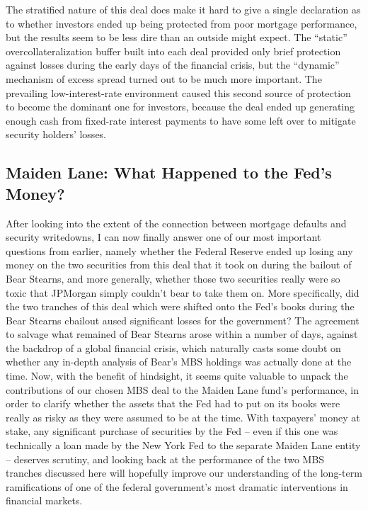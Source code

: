 \documentclass[12pt]{article}
\begin{document}
The stratified nature of this deal does make it hard to give a single declaration as to whether investors ended up being protected from poor mortgage performance, but the results seem to be less dire than an outside might expect. The “static” overcollateralization buffer built into each deal provided only brief protection against losses during the early days of the financial crisis, but the “dynamic” mechanism of excess spread turned out to be much more important. The prevailing low-interest-rate environment caused this second source of protection to become the dominant one for investors, because the deal ended up generating enough cash from fixed-rate interest payments to have some left over to mitigate security holders’ losses. 

\subsection*{Maiden Lane: What Happened to the Fed's Money?}

After looking into the extent of the connection between mortgage defaults and security writedowns, I can now finally answer one of our most important questions from earlier, namely whether the Federal Reserve ended up losing any money on the two securities from this deal that it took on during the bailout of Bear Stearns, and more generally, whether those two securities really were so toxic that JPMorgan simply couldn’t bear to take them on. More specifically, did the two tranches of this deal which were shifted onto the Fed’s books during the Bear Stearns cbailout aused significant losses for the government? The agreement to salvage what remained of Bear Stearns arose within a number of days, against the backdrop of a global financial crisis, which naturally casts some doubt on whether any in-depth analysis of Bear’s MBS holdings was actually done at the time. Now, with the benefit of hindsight, it seems quite valuable to unpack the contributions of our chosen MBS deal to the Maiden Lane fund’s performance, in order to clarify whether the assets that the Fed had to put on its books were really as risky as they were assumed to be at the time. With taxpayers’ money at stake, any significant purchase of securities by the Fed – even if this one was technically a loan made by the New York Fed to the separate Maiden Lane entity – deserves scrutiny, and looking back at the performance of the two MBS tranches discussed here will hopefully improve our understanding of the long-term ramifications of one of the federal government’s most dramatic interventions in financial markets.
\end{document}
